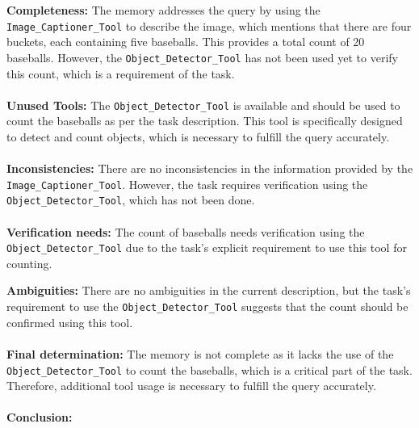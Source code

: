     
    \begin{plannerbox}
    \textbf{Completeness:}
    The memory addresses the query by using the \texttt{Image\_Captioner\_Tool} to describe the image, which mentions that there are four buckets, each containing five baseballs. This provides a total count of 20 baseballs. However, the \texttt{Object\_Detector\_Tool} has not been used yet to verify this count, which is a requirement of the task.
    \\\\
    \textbf{Unused Tools:}
    The \texttt{Object\_Detector\_Tool} is available and should be used to count the baseballs as per the task description. This tool is specifically designed to detect and count objects, which is necessary to fulfill the query accurately.
    \\\\
    \textbf{Inconsistencies:}
    There are no inconsistencies in the information provided by the \texttt{Image\_Captioner\_Tool}. However, the task requires verification using the \texttt{Object\_Detector\_Tool}, which has not been done.
    \\\\
    \textbf{Verification needs:}
    The count of baseballs needs verification using the \texttt{Object\_Detector\_Tool} due to the task's explicit requirement to use this tool for counting.
    \end{plannerbox}
    
    \begin{plannerbox}
    \textbf{Ambiguities:}
    There are no ambiguities in the current description, but the task's requirement to use the \texttt{Object\_Detector\_Tool} suggests that the count should be confirmed using this tool.
    \\\\
    \textbf{Final determination:}
    The memory is not complete as it lacks the use of the \texttt{Object\_Detector\_Tool} to count the baseballs, which is a critical part of the task. Therefore, additional tool usage is necessary to fulfill the query accurately.
    \\\\
    \textbf{Conclusion:} 
    \end{plannerbox}
    
